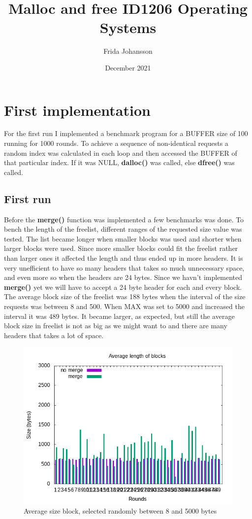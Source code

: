 \documentclass[12pt, letterpaper]{article}
\title{Malloc and free ID1206 Operating Systems}
\author{Frida Johansson}
\date{December 2021}
\begin{document}
\maketitle
\section{First implementation}
For the first run I implemented a benchmark program for a BUFFER size of 100 running for 1000 rounds.
To achieve a sequence of non-identical requests a random index was calculated in each loop and then accessed the BUFFER of that particular index.
If it was NULL, \textbf{dalloc()} was called, else \textbf{dfree()} was called. 


\subsection{First run}

Before the \textbf{merge()} function was implemented a few benchmarks was done. To bench the length of the freelist, different ranges of the requested size value was tested.
The list became longer when smaller blocks was used and shorter when larger blocks were used. Since more smaller blocks could fit the freelist rather than larger ones it affected 
the length and thus ended up in more headers.
It is very unefficient to have so many headers that takes so much unnecessary space, and even more so when the headers are 24 bytes.
Since we havn't implemented \textbf{merge()} yet we will have to accept a 24 byte header for each and every block. The average block size of the freelist was 188 bytes when 
the interval of the size requests was between 8 and 500. When MAX was set to 5000 and increased the interval it was 489 bytes. It became larger, as expected, but still the average 
block size in freelist is not as big as we might want to and there are many headers that takes a lot of space.

\begin{figure}[h]
    \center
    \includegraphics[scale=0.65]{graph0.png}
    \caption{Average size block, selected randomly between 8 and 5000 bytes}
    \label{fig:graph0}
\end{figure}
\end{document}
